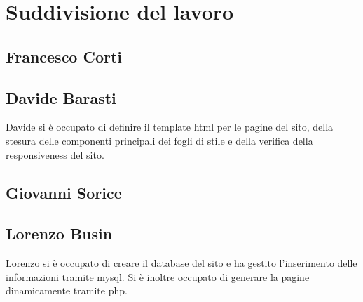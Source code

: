 \newpage

\section{Suddivisione del lavoro}

\subsection{Francesco Corti}

\subsection{Davide Barasti}
Davide si è occupato di definire il template html per le pagine del sito, della stesura delle componenti principali dei fogli di stile e della verifica della responsiveness del sito.

\subsection{Giovanni Sorice}

\subsection{Lorenzo Busin}
Lorenzo si è occupato di creare il database del sito e ha gestito l'inserimento delle informazioni tramite mysql. Si è inoltre occupato di generare la pagine dinamicamente tramite php. 